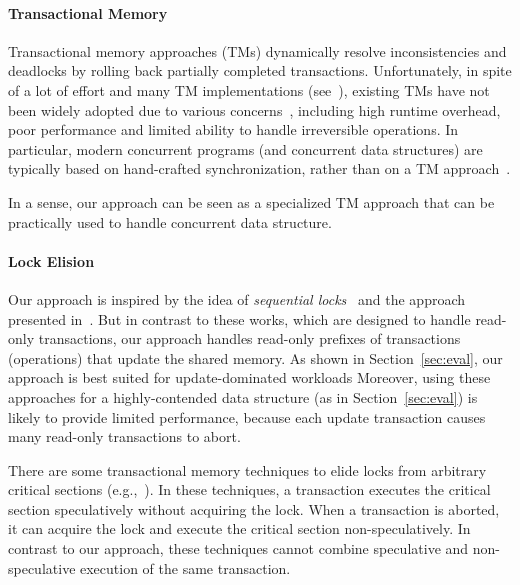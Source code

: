 \paragraph{Transactional Memory}
Transactional memory approaches (TMs) dynamically resolve inconsistencies
and deadlocks by rolling back partially completed transactions.
%
Unfortunately, in spite of a lot of effort and many TM implementations (see~\cite{HLR:SLCA2010}), existing TMs
have not been widely adopted due to various concerns~\cite{DuffyTM2010,Cascaval:2008,mckenneyParallel}, including high runtime overhead,
poor performance and limited ability to handle irreversible operations.
In particular, modern concurrent programs (and concurrent data structures) are typically based on hand-crafted synchronization, rather than  on a TM approach~\cite{Ohad:OOPSLA11}.

In a sense, our approach can be seen as a specialized TM approach that can be practically used to handle concurrent data structure.


\paragraph{Lock Elision}
Our approach is inspired by the idea of \emph{sequential locks}~\cite{mckenneyParallel} and the approach presented in~\cite{Nakaike:2010}.
But  in contrast to these works,  which are designed to handle read-only transactions,
our approach handles read-only prefixes of transactions (operations) that update the shared memory. 
As shown in Section~\ref{sec:eval}, our approach is best suited for update-dominated workloads
Moreover, using these approaches for a highly-contended data structure (as in Section~\ref{sec:eval}) is likely to provide limited performance, 
because each update transaction causes many read-only transactions to abort.

There are some transactional memory techniques to elide locks from arbitrary critical sections (e.g.,~\cite{Rajwar:2002:TLE:635508.605399,Roy:2009:RSS:1519065.1519094,Afek:2014:SHL:2611462.2611482}).
In these techniques, a transaction executes the critical section speculatively without acquiring the lock.
When a transaction is aborted, it can acquire the lock and execute the critical section non-speculatively.
In contrast to our approach, these techniques cannot combine speculative and non-speculative execution of the same transaction.






